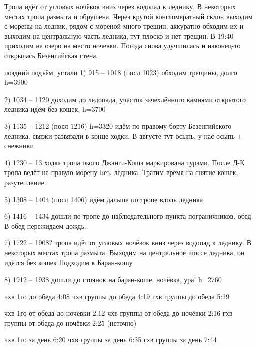 Тропа идёт от угловых ночёвок вниз через водопад к леднику. В некоторых местах тропа размыта и обрушена. Через крутой конгломератный склон выходим с морены на ледник, рядом с мореной много трещин, аккуратно обходим их и выходим на центральную часть ледника, тут плоско и нет трещин. В 19:40 приходим на озеро на место ночевки. Погода снова улучшилась и наконец-то открылась Безенгийская стена.

поздний подъём, устали
1) 915 -- 1018 (посл 1023) обходим трещины, долго h=3900

2) 1034 -- 1120 доходим до ледопада, участок зачехлённого камнями открытого ледника идём без кошек. h=3700

3) 1135 -- 1212 (посл 1216) h=3320 идём по правому борту Безенгийского ледника. связки развязали в конце ходки. В августе тут осыпь, у нас осыпь + снежники

4) 1230 -- 13 ходка тропа около Джанги-Коша маркирована турами. После Д-К тропа ведёт на правую морену Без. ледника. Тратим время на снятие кошек, разутепление.

5) 1308 -- 1404 (посл 1406) идём дальше по тропе вдоль ледника

6) 1416 -- 1434 дошли по тропе до наблюдательного пункта пограничников, обед. В обед пережидаем дождь.

7) 1722 -- 1908? тропа идёт от угловых ночёвок вниз через водопад к леднику. В некоторых местах тропа размыта. Выходим на центральное шоссе ледника, он идётся без кошек
Подходим к Баран-кошу

8) 1912 -- 1938 дошли до стоянок на баран-коше, ночёвка, ура! h=2760

чхв 1го до обеда 4:08
чхв группы до обеда 4:19
гхв группы до обеда 5:19

чхв 1го от обеда до ночёвки 2:12
чхв группы от обеда до ночёвки 2:16
гхв группы от обеда до ночёвки 2:25 (неточно)

чхв 1го за день 6:20
чхв группы за день 6:35
гхв группы за день 7:44

    \FloatBarrier
